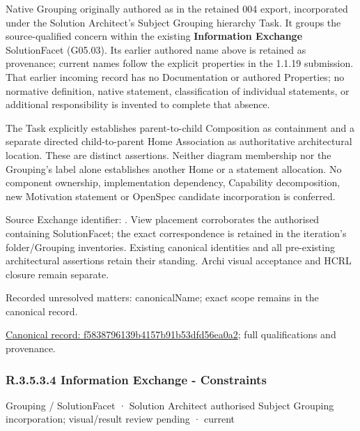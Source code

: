 Native Grouping originally authored as \texttt{} in the retained 004 export,
incorporated under the Solution Architect's Subject Grouping hierarchy Task.
It groups the source-qualified \texttt{} concern within
the existing \textbf{Information Exchange} SolutionFacet (G05.03). Its earlier authored name above is retained as provenance; current names
follow the explicit properties in the 1.1.19 submission.
That earlier incoming record has no Documentation or authored Properties; no normative
definition, native statement, classification of individual statements, or
additional responsibility is invented to complete that absence.



The Task explicitly establishes parent-to-child Composition as containment and
a separate directed child-to-parent Home Association as authoritative architectural
location. These are distinct assertions. Neither diagram membership nor the
Grouping's label alone establishes another Home or a statement allocation.
No component ownership, implementation dependency, Capability decomposition,
new Motivation statement or OpenSpec candidate incorporation is conferred.



Source Exchange identifier: \texttt{}. View placement corroborates
the authorised containing SolutionFacet; the exact correspondence is retained in the
iteration's folder/Grouping inventories. Existing canonical identities and all
pre-existing architectural assertions retain their standing. Archi visual
acceptance and HCRL closure remain separate.


{\small Recorded unresolved matters: canonicalName; exact scope remains in the canonical record.}\par
{\footnotesize \href{../../../../../../../continuum/grouping/f5838796139b4157b91b53dfd56ea0a2.md}{Canonical record: f5838796139b4157b91b53dfd56ea0a2}; full qualifications and provenance.}\par
\subsubsection*{R.3.5.3.4 Information Exchange - Constraints}
\label{navigation:R.3.5.3.4}

\label{element:4df45b11a8c64144acea7c240a2c93d1}
{\small Grouping / SolutionFacet · Solution Architect authorised Subject Grouping incorporation; visual/result review pending · current}\par


